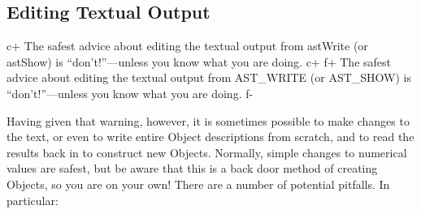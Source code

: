 \documentclass[twoside,11pt]{article}
\begin{document}
\subsection{Editing Textual Output}

c+
The safest advice about editing the textual output from astWrite (or
astShow) is ``don't!''---unless you know what you are doing.
c+
f+
The safest advice about editing the textual output from AST\_WRITE (or
AST\_SHOW) is ``don't!''---unless you know what you are doing.
f-

Having given that warning, however, it is sometimes possible to make
changes to the text, or even to write entire Object descriptions from
scratch, and to read the results back in to construct new
Objects. Normally, simple changes to numerical values are safest, but
be aware that this is a back door method of creating Objects, so
you are on your own! There are a number of potential pitfalls. In
particular:
\end{document}
